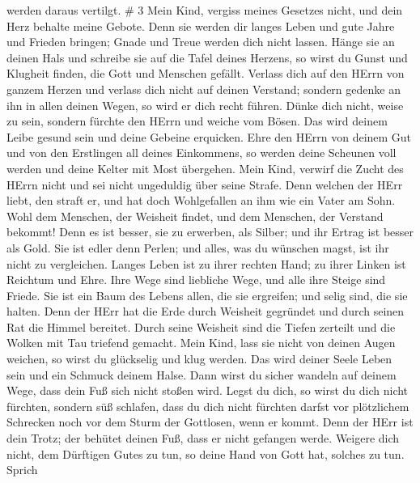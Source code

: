 werden daraus vertilgt. \# 3  Mein Kind, vergiss meines
Gesetzes nicht, und dein Herz behalte meine Gebote.  Denn
sie werden dir langes Leben und gute Jahre und Frieden bringen;
 Gnade und Treue werden dich nicht lassen. Hänge sie an
deinen Hals und schreibe sie auf die Tafel deines Herzens, 
so wirst du Gunst und Klugheit finden, die Gott und Menschen gefällt.
 Verlass dich auf den HErrn von ganzem Herzen und verlass
dich nicht auf deinen Verstand;  sondern gedenke an ihn in
allen deinen Wegen, so wird er dich recht führen.  Dünke
dich nicht, weise zu sein, sondern fürchte den HErrn und weiche vom
Bösen.  Das wird deinem Leibe gesund sein und deine Gebeine
erquicken.  Ehre den HErrn von deinem Gut und von den
Erstlingen all deines Einkommens,  so werden deine Scheunen
voll werden und deine Kelter mit Most übergehen.  Mein
Kind, verwirf die Zucht des HErrn nicht und sei nicht ungeduldig über
seine Strafe.  Denn welchen der HErr liebt, den straft er,
und hat doch Wohlgefallen an ihm wie ein Vater am Sohn. 
Wohl dem Menschen, der Weisheit findet, und dem Menschen, der Verstand
bekommt!  Denn es ist besser, sie zu erwerben, als Silber;
und ihr Ertrag ist besser als Gold.  Sie ist edler denn
Perlen; und alles, was du wünschen magst, ist ihr nicht zu vergleichen.
 Langes Leben ist zu ihrer rechten Hand; zu ihrer Linken
ist Reichtum und Ehre.  Ihre Wege sind liebliche Wege, und
alle ihre Steige sind Friede.  Sie ist ein Baum des Lebens
allen, die sie ergreifen; und selig sind, die sie halten. 
Denn der HErr hat die Erde durch Weisheit gegründet und durch seinen Rat
die Himmel bereitet.  Durch seine Weisheit sind die Tiefen
zerteilt und die Wolken mit Tau triefend gemacht.  Mein
Kind, lass sie nicht von deinen Augen weichen, so wirst du glückselig
und klug werden.  Das wird deiner Seele Leben sein und ein
Schmuck deinem Halse.  Dann wirst du sicher wandeln auf
deinem Wege, dass dein Fuß sich nicht stoßen wird.  Legst
du dich, so wirst du dich nicht fürchten, sondern süß schlafen,
 dass du dich nicht fürchten darfst vor plötzlichem
Schrecken noch vor dem Sturm der Gottlosen, wenn er kommt. 
Denn der HErr ist dein Trotz; der behütet deinen Fuß, dass er nicht
gefangen werde.  Weigere dich nicht, dem Dürftigen Gutes zu
tun, so deine Hand von Gott hat, solches zu tun.  Sprich
